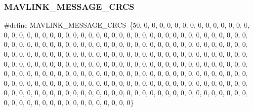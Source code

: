 \mbox{\label{minimal_8h_a3f709d5835acb54a11202a5fdc7a6bfe}} 
\subsubsection{M\+A\+V\+L\+I\+N\+K\+\_\+\+M\+E\+S\+S\+A\+G\+E\+\_\+\+C\+R\+CS}
{\footnotesize\ttfamily \#define M\+A\+V\+L\+I\+N\+K\+\_\+\+M\+E\+S\+S\+A\+G\+E\+\_\+\+C\+R\+CS~\{50, 0, 0, 0, 0, 0, 0, 0, 0, 0, 0, 0, 0, 0, 0, 0, 0, 0, 0, 0, 0, 0, 0, 0, 0, 0, 0, 0, 0, 0, 0, 0, 0, 0, 0, 0, 0, 0, 0, 0, 0, 0, 0, 0, 0, 0, 0, 0, 0, 0, 0, 0, 0, 0, 0, 0, 0, 0, 0, 0, 0, 0, 0, 0, 0, 0, 0, 0, 0, 0, 0, 0, 0, 0, 0, 0, 0, 0, 0, 0, 0, 0, 0, 0, 0, 0, 0, 0, 0, 0, 0, 0, 0, 0, 0, 0, 0, 0, 0, 0, 0, 0, 0, 0, 0, 0, 0, 0, 0, 0, 0, 0, 0, 0, 0, 0, 0, 0, 0, 0, 0, 0, 0, 0, 0, 0, 0, 0, 0, 0, 0, 0, 0, 0, 0, 0, 0, 0, 0, 0, 0, 0, 0, 0, 0, 0, 0, 0, 0, 0, 0, 0, 0, 0, 0, 0, 0, 0, 0, 0, 0, 0, 0, 0, 0, 0, 0, 0, 0, 0, 0, 0, 0, 0, 0, 0, 0, 0, 0, 0, 0, 0, 0, 0, 0, 0, 0, 0, 0, 0, 0, 0, 0, 0, 0, 0, 0, 0, 0, 0, 0, 0, 0, 0, 0, 0, 0, 0, 0, 0, 0, 0, 0, 0, 0, 0, 0, 0, 0, 0, 0, 0, 0, 0, 0, 0, 0, 0, 0, 0, 0, 0, 0, 0, 0, 0, 0, 0, 0, 0, 0, 0, 0, 0, 0, 0, 0, 0, 0, 0, 0, 0, 0, 0, 0, 0\}}

\mbox{\label{minimal_8h_a384e37b2c133fdf33407436a982d2fb7}} 
